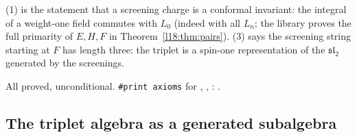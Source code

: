 \begin{physics}
(1) is the statement that a screening charge is a conformal invariant: the integral of a weight-one
field commutes with $L_0$ (indeed with all $L_n$; the library proves the full primarity of $E,H,F$
in Theorem~\ref{l18:thm:pairs}). (3) says the screening string starting at $F$ has length three:
the triplet is a spin-one representation of the $\mathfrak{sl}_2$ generated by the screenings.
\end{physics}
\begin{status}
All proved, unconditional. \texttt{\#print axioms} for , ,
: .
\end{status}

\subsection{The triplet algebra as a generated subalgebra}

